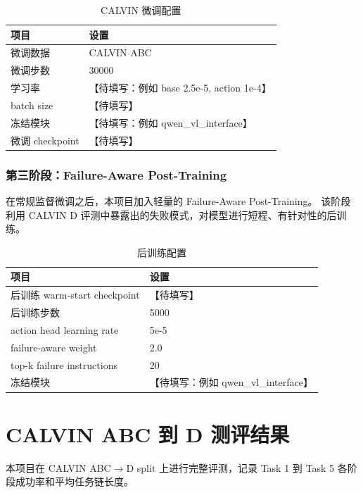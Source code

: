 \documentclass[10pt,a4paper,fontset=none]{ctexart}
\newcommand{\todo}[1]{\textcolor{TodoRed}{【#1】}}
\newcommand{\FinetuneSteps}{30000}
\newcommand{\PostTrainSteps}{5000}
\newcommand{\ActionLR}{5e-5}
\newcommand{\FailureAwareWeight}{2.0}
\newcommand{\FailureTopK}{20}
\begin{document}
\begin{table}[H]
\centering
\caption{CALVIN 微调配置}
\begin{tabularx}{0.92\textwidth}{lX}
\toprule
项目 & 设置 \\
\midrule
微调数据 & CALVIN ABC \\
微调步数 & \FinetuneSteps{} \\
学习率 & \todo{待填写：例如 base 2.5e-5, action 1e-4} \\
batch size & \todo{待填写} \\
冻结模块 & \todo{待填写：例如 qwen\_vl\_interface} \\
微调 checkpoint & \todo{待填写} \\
\bottomrule
\end{tabularx}
\end{table}

\subsubsection{第三阶段：Failure-Aware Post-Training}

在常规监督微调之后，本项目加入轻量的 Failure-Aware Post-Training。
该阶段利用 CALVIN D 评测中暴露出的失败模式，对模型进行短程、有针对性的后训练。

\begin{table}[H]
\centering
\caption{后训练配置}
\begin{tabularx}{0.92\textwidth}{lX}
\toprule
项目 & 设置 \\
\midrule
后训练 warm-start checkpoint & \todo{待填写} \\
后训练步数 & \PostTrainSteps{} \\
action head learning rate & \ActionLR{} \\
failure-aware weight & \FailureAwareWeight{} \\
top-k failure instructions & \FailureTopK{} \\
冻结模块 & \todo{待填写：例如 qwen\_vl\_interface} \\
\bottomrule
\end{tabularx}
\end{table}

\section{CALVIN ABC 到 D 测评结果}

本项目在 CALVIN ABC$\rightarrow$D split 上进行完整评测，记录 Task 1 到 Task 5 各阶段成功率和平均任务链长度。
\end{document}
